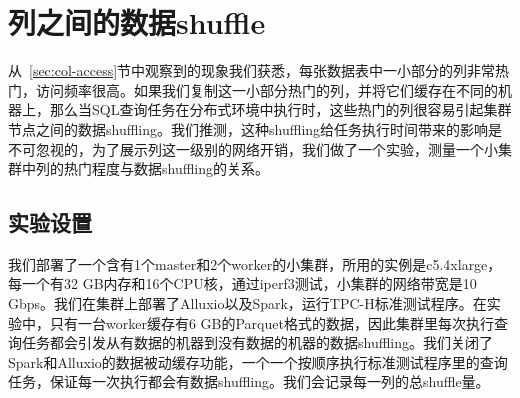 \section{列之间的数据shuffle}
\label{sec:data-shuffle}

\par 从~\ref{sec:col-access}节中观察到的现象我们获悉，每张数据表中一小部分的列非常热门，访问频率很高。如果我们复制这一小部分热门的列，并将它们缓存在不同的机器上，那么当SQL查询任务在分布式环境中执行时，这些热门的列很容易引起集群节点之间的数据shuffling。我们推测，这种shuffling给任务执行时间带来的影响是不可忽视的，为了展示列这一级别的网络开销，我们做了一个实验，测量一个小集群中列的热门程度与数据shuffling的关系。

\subsection{实验设置}
\label{subsec:data-shuffle-setup}

\par 我们部署了一个含有1个master和2个worker的小集群，所用的实例是c5.4xlarge，每一个有32 GB内存和16个CPU核，通过iperf3测试，小集群的网络带宽是10 Gbps。我们在集群上部署了Alluxio以及Spark，运行TPC-H标准测试程序。在实验中，只有一台worker缓存有6 GB的Parquet格式的数据，因此集群里每次执行查询任务都会引发从有数据的机器到没有数据的机器的数据shuffling。我们关闭了Spark和Alluxio的数据被动缓存功能，一个一个按顺序执行标准测试程序里的查询任务，保证每一次执行都会有数据shuffling。我们会记录每一列的总shuffle量。

